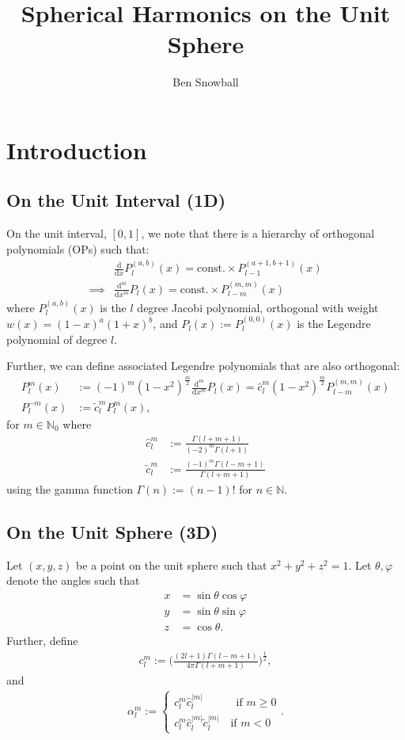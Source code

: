 \documentclass[11pt, oneside]{article}   	%
\title{Spherical Harmonics on the Unit Sphere}
\author{Ben Snowball}
\newcommand{\N}{\mathbb{N}}
\newcommand{\No}{\mathbb{N}_0}
\newcommand{\Plm}{P^m_l}
\newcommand{\costheta}{\cos\theta}
\newcommand{\sintheta}{\sin\theta}
\newcommand{\cosphi}{\cos\varphi}
\newcommand{\sinphi}{\sin\varphi}
\newcommand{\alphalm}{\alpha^m_l}
\newcommand{\clm}{c^m_l}
\newcommand{\ctilde}{\tilde{c}^m_l}
\newcommand{\ctildemod}{\tilde{c}^{|m|}_l}
\newcommand{\chat}{\hat{c}^m_l}
\newcommand{\chatmod}{\hat{c}^{|m|}_l}
\newcommand{\ddx}{\frac{\mathrm{d}}{\mathrm{d}x}}
\newcommand{\dmdxm}{\frac{\mathrm{d}^m}{\mathrm{d}x^m}}
\begin{document}
\maketitle



\section{Introduction}

\subsection{On the Unit Interval (1D)}

On the unit interval, \([0,1]\), we note that there is a hierarchy of orthogonal polynomials (OPs) such that:
\begin{align}
& \ddx P^{(a,b)}_l (x) = \text{const.} \times P^{(a+1,b+1)}_{l-1}(x) \\
\implies & \dmdxm P_l(x) = \text{const.} \times P^{(m,m)}_{l-m}(x)
\end{align}
where \(P^{(a,b)}_l (x)\) is the \(l\) degree Jacobi polynomial, orthogonal with weight \(w(x) = (1-x)^a(1+x)^b\), and \(P_l(x) := P^{(0,0)}_l (x)\) is the Legendre polynomial of degree \(l\).

Further, we can define associated Legendre polynomials that are also orthogonal:
\begin{align}
\Plm(x) &:= (-1)^m (1-x^2)^\frac{m}{2} \dmdxm P_l(x) = \chat (1-x^2)^\frac{m}{2} P^{(m,m)}_{l-m}(x) \\
P^{-m}_l(x) &:= \ctilde \Plm(x),
\end{align}
for \( m \in \No\) where
\begin{align}
\chat &:= \frac{\Gamma(l+m+1)}{(-2)^m\Gamma(l+1)} \\
\ctilde &:= \frac{(-1)^m\Gamma(l-m+1)}{\Gamma(l+m+1)}
\end{align}
using the gamma function \(\Gamma(n) := (n-1)!\) for \(n \in \N\).

\subsection{On the Unit Sphere (3D)}

Let \((x,y,z)\) be a point on the unit sphere such that \(x^2+y^2+z^2 = 1\). Let \(\theta, \varphi\) denote the angles such that
\begin{align}
x &= \sintheta \cosphi \\
y &= \sintheta \sinphi \\
z &= \costheta.
\end{align}
Further, define
\begin{align}
\clm := \Bigg(\frac{(2l+1)\Gamma(l-m+1)}{4\pi\Gamma(l+m+1)}\Bigg)^\frac{1}{2},
\end{align}
and
\begin{align}
\alphalm := \begin{cases} 
		\clm \chatmod \quad \quad \quad \text{if } m \ge 0 \\
		\clm \chatmod \ctildemod \quad \text{if } m < 0
	   \end{cases}.
\end{align}
\end{document}
